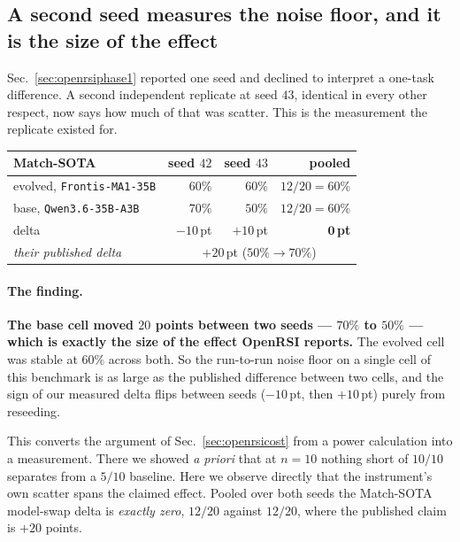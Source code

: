 \subsection{A second seed measures the noise floor, and it is the size of the effect}
\label{sec:openrsiseed43}

Sec.~\ref{sec:openrsiphase1} reported one seed and declined to interpret a one-task
difference. A second independent replicate at seed $43$, identical in every other respect,
now says how much of that was scatter. This is the measurement the replicate existed for.

\begin{center}
\begin{tabular}{lrrr}
\toprule
Match-SOTA & seed $42$ & seed $43$ & pooled \\
\midrule
evolved, \texttt{Frontis-MA1-35B} & $60\%$ & $60\%$ & $12/20 = 60\%$ \\
base, \texttt{Qwen3.6-35B-A3B}    & $70\%$ & $50\%$ & $12/20 = 60\%$ \\
\midrule
delta                             & $-10$\,pt & $+10$\,pt & $\mathbf{0}$\,\textbf{pt} \\
\emph{their published delta}       & \multicolumn{3}{c}{$+20$\,pt ($50\% \to 70\%$)} \\
\bottomrule
\end{tabular}
\end{center}

\paragraph{The finding.}
\textbf{The base cell moved $20$ points between two seeds --- $70\%$ to $50\%$ --- which is
exactly the size of the effect OpenRSI reports.} The evolved cell was stable at $60\%$ across
both. So the run-to-run noise floor on a single cell of this benchmark is as large as the
published difference between two cells, and the sign of our measured delta flips between
seeds ($-10$\,pt, then $+10$\,pt) purely from reseeding.

This converts the argument of Sec.~\ref{sec:openrsicost} from a power calculation into a
measurement. There we showed \emph{a priori} that at $n=10$ nothing short of $10/10$ separates
from a $5/10$ baseline. Here we observe directly that the instrument's own scatter spans the
claimed effect. Pooled over both seeds the Match-SOTA model-swap delta is \emph{exactly zero},
$12/20$ against $12/20$, where the published claim is $+20$ points.

